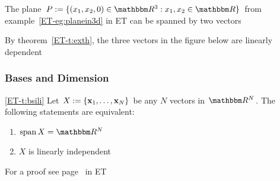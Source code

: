 \begin{frame}

    \vspace{2em}
    \Eg
    The plane
        $P := \setntn{(x_1, x_2, 0) \in \RR^3}{ x_1, x_2 \in \RR}$
    from example~\ref{ET-eg:planein3d} in ET can be
    spanned by two vectors
    
    By theorem~\ref{ET-t:exth}, the three vectors in the
    figure below are linearly dependent 
    \begin{figure}
       \begin{center}
       \end{center}
    \end{figure}

\end{frame}

\begin{frame}\frametitle{Bases and Dimension}

    \vspace{2em}
    \Thm\eqref{ET-t:bsili}
        Let $X := \{ {\mathbf x}_1, \ldots, {\mathbf x}_N \}$ be any $N$ vectors in $\RR^N$.
        The following statements are equivalent:
        \begin{enumerate}
            \item $\Span X = \RR^N$
            \item $X$ is linearly independent
        \end{enumerate}
    
    \vspace{.7em}
    For a proof see page~\pageref{ET-t:bsili} in ET
    
\end{frame}

